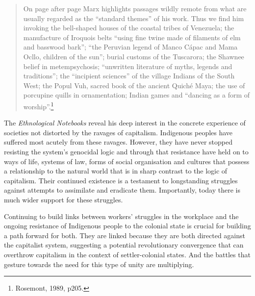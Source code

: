 \blockquote{On page after page Marx highlights passages wildly remote from what are usually regarded as the ``standard themes'' of his work. Thus we find him invoking the bell-shaped houses of the coastal tribes of Venezuela; the manufacture of Iroquois belts ``using fine twine made of filaments of elm and basswood bark''; ``the Peruvian legend of Manco C\'{a}pac and Mama Ocllo, children of the sun''; burial customs of the Tuscarora; the Shawnee belief in metempsychosis; ``unwritten literature of myths, legends and traditions''; the ``incipient sciences'' of the village Indians of the South West; the Popul Vuh, sacred book of the ancient Quich\'{e} Maya; the use of porcupine quills in ornamentation; Indian games and ``dancing as a form of worship''.\footnote{Rosemont, 1989, p205.}}

The \emph{Ethnological Notebooks} reveal his deep interest in the concrete experience of societies not distorted by the ravages of capitalism. Indigenous peoples have suffered most acutely from these ravages. However, they have never stopped resisting the system's genocidal logic and through that resistance have held on to ways of life, systems of law, forms of social organisation and cultures that possess a relationship to the natural world that is in sharp contrast to the logic of capitalism. Their continued existence is a testament to longstanding struggles against attempts to assimilate and eradicate them. Importantly, today there is much wider support for these struggles.

Continuing to build links between workers' struggles in the workplace and the ongoing resistance of Indigenous people to the colonial state is crucial for building a path forward for both. They are linked because they are both directed against the capitalist system, suggesting a potential revolutionary convergence that can overthrow capitalism in the context of settler-colonial states. And the battles that gesture towards the need for this type of unity are multiplying.
